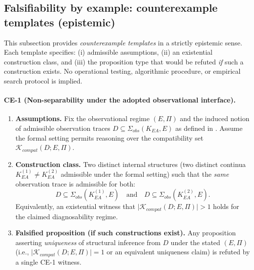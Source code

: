 \subsection{Falsifiability by example: counterexample templates (epistemic)}
\label{subsec:falsifiability-by-example}

This subsection provides \emph{counterexample templates} in a strictly epistemic
sense.
Each template specifies:
(i) admissible assumptions,
(ii) an existential construction class, and
(iii) the proposition type that would be refuted \emph{if} such a construction
exists.
No operational testing, algorithmic procedure, or empirical search protocol is
implied.

\paragraph{CE-1 (Non-separability under the adopted observational interface).}
\begin{enumerate}
  \item \textbf{Assumptions.}
  Fix the observational regime $(E,\Pi)$ and the induced notion of admissible
  observation traces $D \subseteq \Sigma_{obs}(K_{EA},E)$ as defined in
  .
  Assume the formal setting permits reasoning over the compatibility set
  $\mathcal{K}_{compat}(D;E,\Pi)$.

  \item \textbf{Construction class.}
  Two distinct internal structures (two distinct continua
  $K^{(1)}_{EA} \neq K^{(2)}_{EA}$ admissible under the formal setting) such that
  the \emph{same} observation trace is admissible for both:
  \[
    D \subseteq \Sigma_{obs}(K^{(1)}_{EA},E)
    \quad\text{and}\quad
    D \subseteq \Sigma_{obs}(K^{(2)}_{EA},E).
  \]
  Equivalently, an existential witness that
  $\lvert \mathcal{K}_{compat}(D;E,\Pi) \rvert > 1$ holds for the claimed
  diagnosability regime.

  \item \textbf{Falsified proposition (if such constructions exist).}
  Any proposition asserting \emph{uniqueness} of structural inference from $D$
  under the stated $(E,\Pi)$ (i.e., $\lvert\mathcal{K}_{compat}(D;E,\Pi)\rvert=1$
  or an equivalent uniqueness claim) is refuted by a single CE-1 witness.
\end{enumerate}

